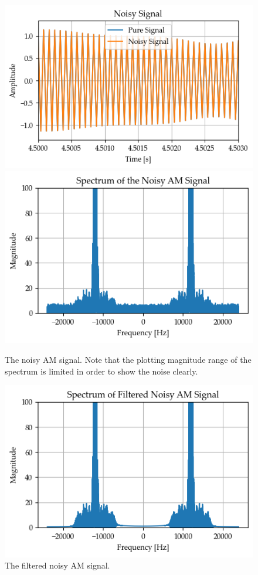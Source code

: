\documentclass[../ECE459FinalProjectReport.tex]{subfiles}
\begin{document}
\begin{figure}[b]
    \centering
    \includegraphics[width=0.49\linewidth]{plots/am/noisy_time.png}
    \includegraphics[width=0.49\linewidth]{plots/am/noisy_spectrum.png}
    \caption{The noisy AM signal. Note that the plotting magnitude range of the spectrum is limited in order to show the noise clearly.}
    \label{fig:noisy-am}
\end{figure}
\begin{figure}[b]
    \centering
    \includegraphics[width=0.6\linewidth]{plots/am/noisy_spectrum_filtered.png}
    \caption{The filtered noisy AM signal.}
    \label{fig:noisy-am-filtered}
\end{figure}
\end{document}
